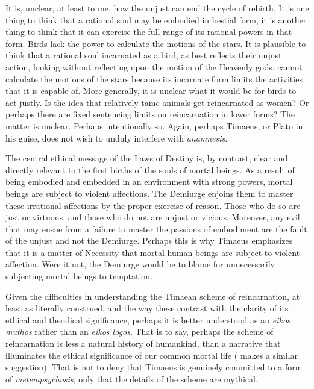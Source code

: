 It is, unclear, at least to me, how the unjust can end the cycle of rebirth. It is one thing to think that a rational soul may be embodied in bestial form, it is another thing to think that it can exercise the full range of its rational powers in that form. Birds lack the power to calculate the motions of the stars. It is plausible to think that a rational soul incarnated as a bird, as best reflects their unjust action, looking without reflecting upon the motion of the Heavenly gods. cannot calculate the motions of the stars because its incarnate form limits the activities that it is capable of. More generally, it is unclear what it would be for birds to act justly. Is the idea that relatively tame animals get reincarnated as women? Or perhaps there are fixed sentencing limits on reincarnation in lower forms? The matter is unclear. Perhaps intentionally so. Again, perhaps Timaeus, or Plato in his guise, does not wish to unduly interfere with \emph{anamnesis}.

The central ethical message of the Laws of Destiny is, by contrast, clear and directly relevant to the first births of the souls of mortal beings. As a result of being embodied and embedded in an environment with strong powers, mortal beings are subject to violent affections. The Demiurge enjoins them to master these irrational affections by the proper exercise of reason. Those who do so are just or virtuous, and those who do not are unjust or vicious. Moreover, any evil that may ensue from a failure to master the passions of embodiment are the fault of the unjust and not the Demiurge. Perhaps this is why Timaeus emphasizes that it is a matter of Necessity that mortal human beings are subject to violent affection. Were it not, the Demiurge would be to blame for unnecessarily subjecting mortal beings to temptation. 

Given the difficulties in understanding the Timaean scheme of reincarnation, at least as literally construed, and the way these contrast with the clarity of its ethical and theodical significance, perhaps it is better understood as an \emph{eikos muthos} rather than an \emph{eikos logos}. That is to say, perhaps the scheme of reincarnation is less a natural history of humankind, than a narrative that illuminates the ethical significance of our common mortal life (\citealt[262]{Taylor:1929ov} makes a similar suggestion). That is not to deny that Timaeus is genuinely committed to a form of \emph{metempsychosis}, only that the details of the scheme are mythical.

